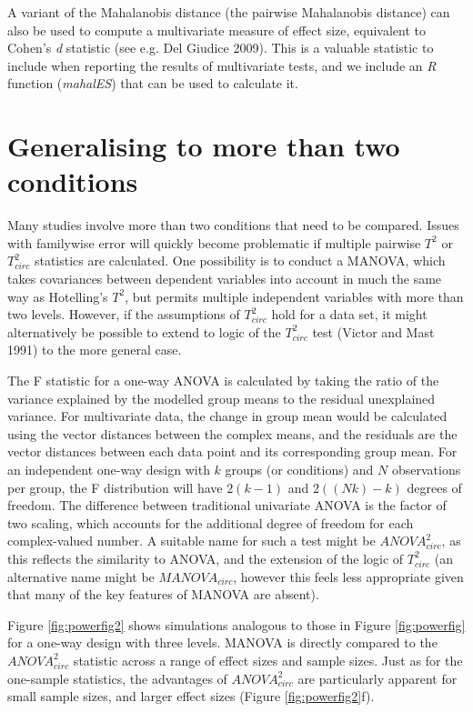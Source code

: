 \documentclass[]{article}
\begin{document}
A variant of the Mahalanobis distance (the pairwise Mahalanobis distance) can also be used to compute a multivariate measure of effect size, equivalent to Cohen's \emph{d} statistic (see e.g. Del Giudice 2009). This is a valuable statistic to include when reporting the results of multivariate tests, and we include an \emph{R} function (\emph{mahalES}) that can be used to calculate it.

\hypertarget{generalising-to-more-than-two-conditions}{%
\section{Generalising to more than two conditions}\label{generalising-to-more-than-two-conditions}}

Many studies involve more than two conditions that need to be compared. Issues with familywise error will quickly become problematic if multiple pairwise \(T^2\) or \(T^2_{circ}\) statistics are calculated. One possibility is to conduct a MANOVA, which takes covariances between dependent variables into account in much the same way as Hotelling's \(T^2\), but permits multiple independent variables with more than two levels. However, if the assumptions of \(T^2_{circ}\) hold for a data set, it might alternatively be possible to extend to logic of the \(T^2_{circ}\) test (Victor and Mast 1991) to the more general case.

The F statistic for a one-way ANOVA is calculated by taking the ratio of the variance explained by the modelled group means to the residual unexplained variance. For multivariate data, the change in group mean would be calculated using the vector distances between the complex means, and the residuals are the vector distances between each data point and its corresponding group mean. For an independent one-way design with \(k\) groups (or conditions) and \(N\) observations per group, the F distribution will have \(2(k-1)\) and \(2((Nk)-k)\) degrees of freedom. The difference between traditional univariate ANOVA is the factor of two scaling, which accounts for the additional degree of freedom for each complex-valued number. A suitable name for such a test might be \({ANOVA}^2_{circ}\), as this reflects the similarity to ANOVA, and the extension of the logic of \(T^2_{circ}\) (an alternative name might be \(MANOVA_{circ}\), however this feels less appropriate given that many of the key features of MANOVA are absent).

Figure \ref{fig:powerfig2} shows simulations analogous to those in Figure \ref{fig:powerfig} for a one-way design with three levels. MANOVA is directly compared to the \({ANOVA}^2_{circ}\) statistic across a range of effect sizes and sample sizes. Just as for the one-sample statistics, the advantages of \({ANOVA}^2_{circ}\) are particularly apparent for small sample sizes, and larger effect sizes (Figure \ref{fig:powerfig2}f).
\end{document}
